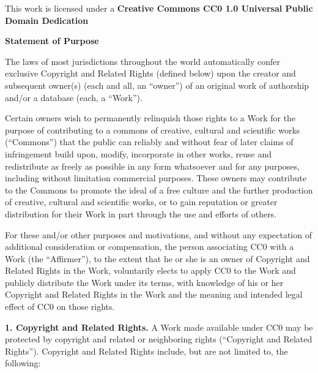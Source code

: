\noindent This work is licensed under a \newline
\textbf{Creative Commons CC0 1.0 Universal Public Domain Dedication}

\noindent \textbf{Statement of Purpose}

\noindent The laws of most jurisdictions throughout the world
automatically confer exclusive Copyright and Related Rights
(defined below) upon the creator and subsequent owner(s) (each
and all, an ``owner'') of an original work of authorship and/or
a database (each, a ``Work'').

\noindent Certain owners wish to permanently relinquish those rights
to a Work for the purpose of contributing to a commons of
creative, cultural and scientific works (``Commons'') that the
public can reliably and without fear of later claims of
infringement build upon, modify, incorporate in other works,
reuse and redistribute as freely as possible in any form
whatsoever and for any purposes, including without limitation
commercial purposes. These owners may contribute to the
Commons to promote the ideal of a free culture and the further
production of creative, cultural and scientific works, or to
gain reputation or greater distribution for their Work in part
through the use and efforts of others.

\noindent For these and/or other purposes and motivations, and
without any expectation of additional consideration or
compensation, the person associating CC0 with a Work (the
``Affirmer''), to the extent that he or she is an owner of
Copyright and Related Rights in the Work, voluntarily elects
to apply CC0 to the Work and publicly distribute the Work
under its terms, with knowledge of his or her Copyright and
Related Rights in the Work and the meaning and intended legal
effect of CC0 on those rights.

\noindent \textbf{1. Copyright and Related Rights.}
A Work made available under CC0 may be protected by
copyright and related or neighboring rights (``Copyright and
Related Rights''). Copyright and Related Rights include, but
are not limited to, the following:

